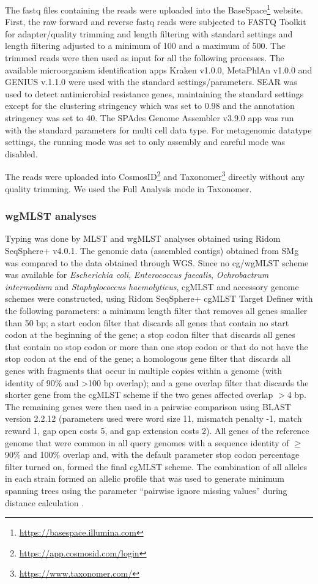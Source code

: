 The fastq files containing the reads were uploaded into the BaseSpace\footnote{\url{https://basespace.illumina.com}} website. 
First, the raw forward and reverse fastq reads were subjected to FASTQ Toolkit for adapter/quality trimming and length filtering with standard settings and length filtering adjusted to a minimum of 100 and a maximum of 500. 
The trimmed reads were then used as input for all the following processes. 
The available microorganism identification apps Kraken v1.0.0, MetaPhlAn v1.0.0 and GENIUS v.1.1.0 were used with the standard settings/parameters.
SEAR was used to detect antimicrobial resistance genes, maintaining the standard settings except for the clustering stringency which was set to 0.98 and the annotation stringency was set to 40.
The SPAdes Genome Assembler v3.9.0 app was run with the standard parameters for multi cell data type. 
For metagenomic datatype settings, the running mode was set to only assembly and careful mode was disabled. 

The reads were uploaded into CosmosID\footnote{\url{https://app.cosmosid.com/login}} and Taxonomer\footnote{\url{https://www.taxonomer.com/}} \citep{flygare_taxonomer_2016} directly without any quality trimming. 
We used the Full Analysis mode in Taxonomer.

\subsubsection{wgMLST analyses}

Typing was done by MLST and wgMLST analyses obtained using Ridom SeqSphere+ v4.0.1. 
The genomic data (assembled contigs) obtained from SMg was compared to the data obtained through WGS.
Since no cg/wgMLST scheme was available for \textit{Escherichia coli}, \textit{Enterococcus faecalis}, \textit{Ochrobactrum intermedium} and \textit{Staphylococcus haemolyticus}, cgMLST and accessory genome schemes were constructed, using Ridom SeqSphere+ cgMLST Target Definer with the following parameters: a minimum length filter that removes all genes smaller than 50 bp; a start codon filter that discards all genes that contain no start codon at the beginning of the gene; a stop codon filter that discards all genes that contain no stop codon or more than one stop codon or that do not have the stop codon at the end of the gene; a homologous gene filter that discards all genes with fragments that occur in multiple copies within a genome (with identity of 90\% and >100 bp overlap); and a gene overlap filter that discards the shorter gene from the cgMLST scheme if the two genes affected overlap $>$4 bp. 
The remaining genes were then used in a pairwise comparison using BLAST version 2.2.12 (parameters used were word size 11, mismatch penalty -1, match reward 1, gap open costs 5, and gap extension costs 2). 
All genes of the reference genome that were common in all query genomes with a sequence identity of $\geq$ 90\% and 100\% overlap and, with the default parameter stop codon percentage filter turned on, formed the final cgMLST scheme. 
The combination of all alleles in each strain formed an allelic profile that was used to generate minimum spanning trees using the parameter “pairwise ignore missing values” during distance calculation \citep{ruppitsch_defining_2015}.

